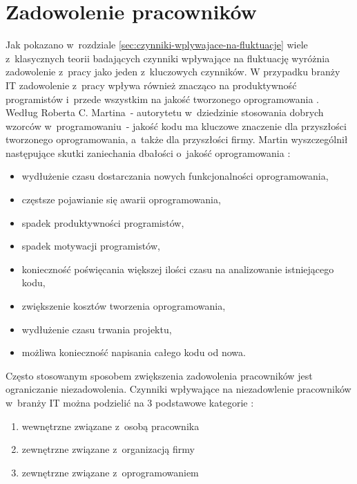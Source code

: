 %
%


\section{Zadowolenie pracowników}\label{sec:it-motivation}
Jak pokazano w~rozdziale \ref{sec:czynniki-wplywajace-na-fluktuacje} wiele z~klasycznych teorii badających czynniki wpływające na fluktuację wyróżnia zadowolenie z~pracy jako jeden z~kluczowych czynników.
W przypadku branży IT zadowolenie z~pracy wpływa również znacząco na produktywność programistów i~przede wszystkim na jakość tworzonego oprogramowania \cite{graziotin-2018}.
Według Roberta C. Martina~- autorytetu w~dziedzinie stosowania dobrych wzorców w~programowaniu~- jakość kodu ma kluczowe znaczenie dla przyszłości tworzonego oprogramowania, a~także dla przyszłości firmy.
Martin wyszczególnił następujące skutki zaniechania dbałości o~jakość oprogramowania \cite{martin-2014}:
\begin{itemize}
    \item wydłużenie czasu dostarczania nowych funkcjonalności oprogramowania,
    \item częstsze pojawianie się awarii oprogramowania,
    \item spadek produktywności programistów,
    \item spadek motywacji programistów,
    \item konieczność poświęcania większej ilości czasu na analizowanie istniejącego kodu,
    \item zwiększenie kosztów tworzenia oprogramowania,
    \item wydłużenie czasu trwania projektu,
    \item możliwa konieczność napisania całego kodu od nowa.
\end{itemize}

Często stosowanym sposobem zwiększenia zadowolenia pracowników jest ograniczanie niezadowolenia.
Czynniki wpływające na niezadowlenie pracowników w~branży IT można podzielić na 3 podstawowe kategorie \cite{graziotin-2017}:
\begin{enumerate}
    \item wewnętrzne związane z~osobą pracownika
    \item zewnętrzne związane z~organizacją firmy
    \item zewnętrzne związane z~oprogramowaniem
\end{enumerate}

